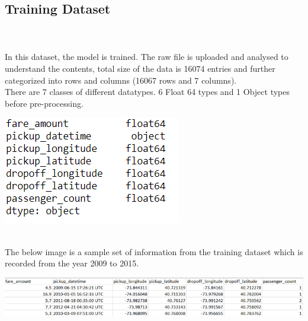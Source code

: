 \documentclass[journal,twoside,web]{ieeecolor}
\begin{document}
\subsection{Training Dataset}
\\
\\
In this dataset, the model is trained. The raw file is uploaded and analysed to understand the contents, total size of the data is 16074 entries and further categorized into rows and columns (16067 rows and 7 columns).
\\
There are 7  classes  of  different  datatypes.  6  Float  64  types and 1 Object types before pre-processing.
\\
\begin{center}
\includegraphics[scale=0.70]{Picture1.png}
\end{center}
\\
The below image is a sample set of information from the training dataset which is recorded from the year 2009 to 2015.
\\
\begin{center}
\includegraphics[scale=0.50]{Picture2.png}
\end{center}
\\
\end{document}
